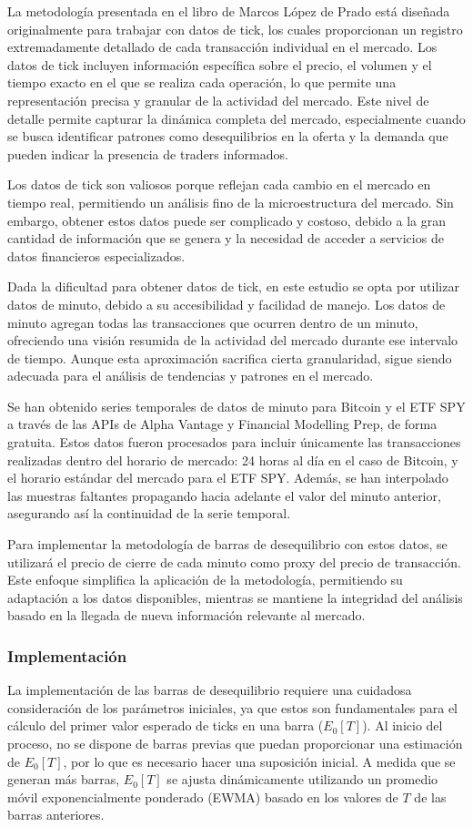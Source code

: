 \documentclass[a4paper,12pt, twoside]{report}
\begin{document}
La metodología presentada en el libro de Marcos López de Prado está diseñada originalmente para trabajar con datos de tick, 
los cuales proporcionan un registro extremadamente detallado de cada transacción individual en el mercado. Los datos de tick 
incluyen información específica sobre el precio, el volumen y el tiempo exacto en el que se realiza cada operación, lo que 
permite una representación precisa y granular de la actividad del mercado. Este nivel de detalle permite capturar la dinámica 
completa del mercado, especialmente cuando se busca identificar patrones como desequilibrios en la oferta y la demanda que 
pueden indicar la presencia de traders informados.

Los datos de tick son valiosos porque reflejan cada cambio en el mercado en tiempo real, permitiendo un análisis fino de la 
microestructura del mercado. Sin embargo, obtener estos datos puede ser complicado y costoso, debido a la gran cantidad de 
información que se genera y la necesidad de acceder a servicios de datos financieros especializados.

Dada la dificultad para obtener datos de tick, en este estudio se opta por utilizar datos de minuto, debido a su accesibilidad 
y facilidad de manejo. Los datos de minuto agregan todas las transacciones que ocurren dentro de un minuto, ofreciendo una 
visión resumida de la actividad del mercado durante ese intervalo de tiempo. Aunque esta aproximación sacrifica cierta 
granularidad, sigue siendo adecuada para el análisis de tendencias y patrones en el mercado.

Se han obtenido series temporales de datos de minuto para Bitcoin y el ETF SPY a través de las APIs de Alpha Vantage y 
Financial Modelling Prep, de forma gratuita. Estos datos fueron procesados para incluir únicamente las transacciones 
realizadas dentro del horario de mercado: 24 horas al día en el caso de Bitcoin, y el horario estándar del mercado para 
el ETF SPY. Además, se han interpolado las muestras faltantes propagando hacia adelante el valor del minuto anterior, 
asegurando así la continuidad de la serie temporal.

Para implementar la metodología de barras de desequilibrio con estos datos, se utilizará el precio de cierre de cada minuto 
como proxy del precio de transacción. Este enfoque simplifica la aplicación de la metodología, permitiendo su adaptación a 
los datos disponibles, mientras se mantiene la integridad del análisis basado en la llegada de nueva información relevante 
al mercado.
\subsubsection{Implementación}
La implementación de las barras de desequilibrio requiere una cuidadosa consideración de los parámetros iniciales, 
ya que estos son fundamentales para el cálculo del primer valor esperado de ticks en una barra (\(E_0[T]\)). Al inicio 
del proceso, no se dispone de barras previas que puedan proporcionar una estimación de \(E_0[T]\), por lo que es necesario 
hacer una suposición inicial. A medida que se generan más barras, \(E_0[T]\) se ajusta dinámicamente utilizando un promedio móvil exponencialmente 
ponderado (EWMA) basado en los valores de \(T\) de las barras anteriores.
\end{document}
